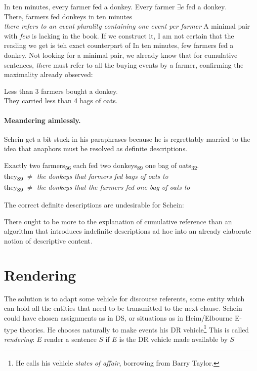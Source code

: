 \documentclass[english]{article}
\newcommand{\fg}{\color{darkred}}
\newcommand{\bg}{\color{blueish}}
\begin{document}
\pex
\a 
In ten minutes, every farmer fed a donkey.
\a 
Every farmer $\exists e$ fed a donkey.\\
There, farmers fed donkeys in ten minutes\\
\emph{there refers to an event plurality containing one event per farmer}
\xe
%
A minimal pair with \emph{few} is lacking in the book. If we construct it, I am not certain that the reading we get is teh exact counterpart of \clastx 
\ex
In ten minutes, few farmers fed a donkey.
\xe
%
Not looking for a minimal pair, we already know that for cumulative sentences, \emph{there} must refer to all the buying events by a farmer, confirming the maximality already observed:

\ex
{\color{darkorange!84!black} Less than 3 farmers} bought {\fg a donkey}.\\
{\color{purple!93!black} They} carried {\color{bluegray!93!black} less than 4 bags of oats}.
\xe

\paragraph{Meandering aimlessly.} Schein get a bit stuck in his paraphrases because he is regrettably married to the idea that anaphors must be resolved as definite descriptions. 

\pex
{\bg Exactly two farmers}\textsubscript{56} each fed {\fg two donkeys}\textsubscript{89} {\color{purple} one bag of oats}\textsubscript{32}.\\
\a 
they\textsubscript{89} $\neq$ \emph{the donkeys that farmers fed bags of oats to}\\
they\textsubscript{89} $\neq$ \emph{the donkeys that the farmers fed one bag of oats to}
\a 

\xe
%
The correct definite descriptions are undesirable for Schein:

\begin{squ}
There ought to be more to the explanation of cumulative reference than an algorithm that introduces indefinite descriptions ad hoc into an already elaborate notion of descriptive content.
\end{squ}

\section{Rendering}

The solution is to adapt some vehicle for discourse referents, some entity which can hold all the entities that need to be transmitted to the next clause. Schein could have chosen assignments as in DS, or situations as in Heim/Elbourne E-type  theories. He chooses naturally to make events his DR vehicle\footnote{He calls his vehicle \emph{states of affair}, borrowing from Barry Taylor.} This is called \emph{rendering}: $E$ render a sentence $S$ if $E$ is the DR vehicle made available by $S$
\end{document}
